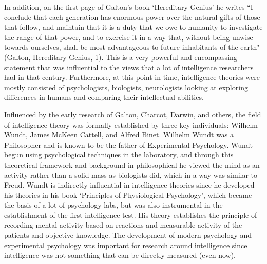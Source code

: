 \documentclass[12pt, oneside]{article}
\begin{document}
\par In addition, on the first page of Galton's book `Hereditary Genius' he writes ``I conclude that each generation has enormous power over the natural gifts of those that follow, and maintain that it is a duty that we owe to humanity to investigate the range of that power, and to exercise it in a way that, without being unwise towards ourselves, shall be most advantageous to future inhabitants of the earth" (Galton, Hereditary Genius, 1). This is a very powerful and encompassing statement that was influential to the views that a lot of intelligence researchers had in that century. Furthermore, at this point in time, intelligence theories were mostly consisted of psychologists, biologists, neurologists looking at exploring differences in humans and comparing their intellectual abilities.

\par Influenced by the early research of Galton, Charcot, Darwin, and others, the field of intelligence theory was formally established by three key individuals: Wilhelm Wundt, James McKeen Cattell, and Alfred Binet. Wilhelm Wundt was a Philosopher and is known to be the father of Experimental Psychology. Wundt begun using psychological techniques in the laboratory, and through this theoretical framework and background in philosophical he viewed the mind as an activity rather than a solid mass as biologists did, which in a way was similar to Freud. Wundt is indirectly influential in intelligence theories since he developed his theories in his book `Principles of Physiological Psychology', which became the basis of a lot of psychology labs, but was also instrumental in the establishment of the first intelligence test. His theory establishes the principle of recording mental activity based on reactions and measurable activity of the patients and objective knowledge. The development of modern psychology and experimental psychology was important for research around intelligence since intelligence was not something that can be directly measured (even now).
\end{document}
